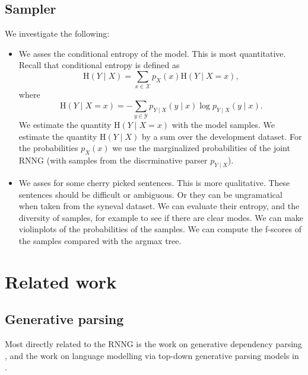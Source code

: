\subsection{Sampler} We investigate the following:
\begin{itemize}
  \item We asses the conditional entropy of the model. This is most quantitative. Recall that conditional entropy is defined as
  \begin{equation}
    \text{H}(Y \mid X) = \sum_{x \in \mathcal{X}} p_X(x)\text{H}(Y \mid X = x),
  \end{equation}
  where
  \begin{equation}
    \text{H}(Y \mid X = x) = - \sum_{y \in \mathcal{Y}} p_{Y \mid X}(y \mid x) \log p_{Y \mid X}(y \mid x).
  \end{equation}
  We estimate the quantity $\text{H}(Y \mid X = x)$ with the model samples. We estimate the quantity $\text{H}(Y \mid X)$ by a sum over the development dataset. For the probabilities $p_X(x)$ we use the marginalized probabilities of the joint RNNG (with samples from the discrminative parser $p_{Y \mid X}$).
  \item We asses for some cherry picked sentences. This is more qualitative. These sentences should be difficult or ambiguous. Or they can be ungramatical when taken from the syneval dataset. We can evaluate their entropy, and the diversity of samples, for example to see if there are clear modes. We can make violinplots of the probabilities of the samples. We can compute the f-scores of the samples compared with the argmax tree.
\end{itemize}

\section{Related work}

\subsection{Generative parsing}
Most directly related to the RNNG is the work on generative dependency parsing \citep{titov2007generative,buys2015bayesian,buys2015generative,buys2018exact}, and the work on language modelling via top-down generative parsing models in \citet{roark2001probabilistic}.

